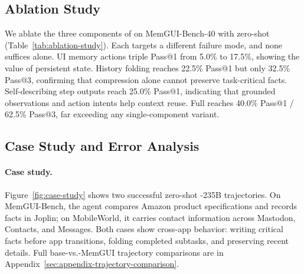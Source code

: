 
\subsection{Ablation Study}
\label{sec:ablation}
\vspace{-0.35em}


\vspace{-0.15em}

We ablate the three components of \conact on MemGUI-Bench-40 with zero-shot  (Table~\ref{tab:ablation-study}). Each targets a different failure mode, and none suffices alone. UI memory actions triple Pass@1 from 5.0\% to 17.5\%, showing the value of persistent state. History folding reaches 22.5\% Pass@1 but only 32.5\% Pass@3, confirming that compression alone cannot preserve task-critical facts. Self-describing step outputs reach 25.0\% Pass@1, indicating that grounded observations and action intents help context reuse. Full \conact reaches 40.0\% Pass@1 / 62.5\% Pass@3, far exceeding any single-component variant. 


\subsection{Case Study and Error Analysis}
\label{sec:case-error}
\vspace{-0.25em}



\paragraph{Case study.}
Figure~\ref{fig:case-study} shows two successful zero-shot \ourmethod-235B trajectories. On MemGUI-Bench, the agent compares Amazon product specifications and records facts in Joplin; on MobileWorld, it carries contact information across Mastodon, Contacts, and Messages. Both cases show cross-app \conact behavior: writing critical facts before app transitions, folding completed subtasks, and preserving recent details. Full base-vs.-MemGUI trajectory comparisons are in Appendix~\ref{sec:appendix-trajectory-comparison}.


